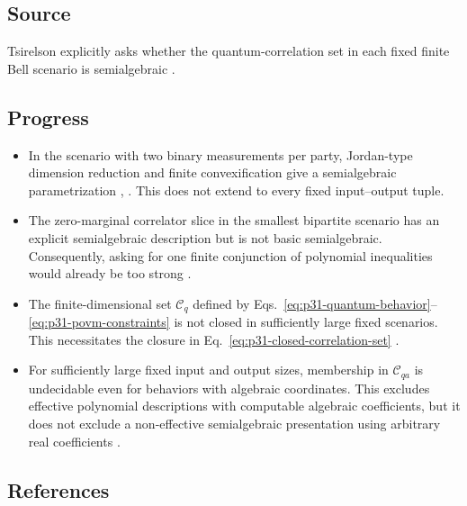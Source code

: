 \subsection*{Source}

Tsirelson explicitly asks whether the quantum-correlation set in each fixed
finite Bell scenario is semialgebraic
.

\subsection*{Progress}

\begin{itemize}
  \item In the scenario with two binary measurements per party, Jordan-type
  dimension reduction and finite convexification give a semialgebraic
  parametrization ,
  .  This does not extend to every fixed
  input--output tuple.

  \item The zero-marginal correlator slice in the smallest bipartite scenario
  has an explicit semialgebraic description but is not basic semialgebraic.
  Consequently, asking for one finite conjunction of polynomial inequalities
  would already be too strong .

  \item The finite-dimensional set $\mathcal C_q$ defined by
  Eqs.~\eqref{eq:p31-quantum-behavior}--\eqref{eq:p31-povm-constraints} is not
  closed in sufficiently large fixed scenarios.  This necessitates the
  closure in Eq.~\eqref{eq:p31-closed-correlation-set}
  .

  \item For sufficiently large fixed input and output sizes, membership in
  $\mathcal C_{qa}$ is undecidable even for behaviors with algebraic
  coordinates.  This excludes effective polynomial descriptions with
  computable algebraic coefficients, but it does not exclude a non-effective
  semialgebraic presentation using arbitrary real coefficients
  .
\end{itemize}

\subsection*{References}

